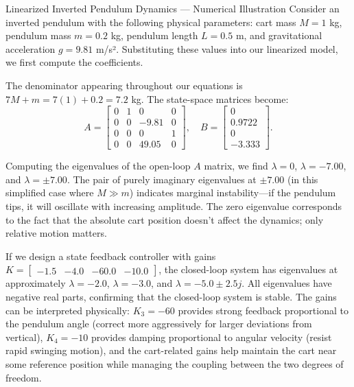 \begin{example}{Linearized Inverted Pendulum Dynamics — Numerical Illustration}
Consider an inverted pendulum with the following physical parameters: cart mass $M = 1$ kg, pendulum mass $m = 0.2$ kg, pendulum length $L = 0.5$ m, and gravitational acceleration $g = 9.81$ m/s². Substituting these values into our linearized model, we first compute the coefficients.

The denominator appearing throughout our equations is $7M + m = 7(1) + 0.2 = 7.2$ kg. The state-space matrices become:
\begin{equation}
A = \begin{bmatrix}
0 & 1 & 0 & 0 \\
0 & 0 & -9.81 & 0 \\
0 & 0 & 0 & 1 \\
0 & 0 & 49.05 & 0
\end{bmatrix}, \quad
B = \begin{bmatrix} 0 \\ 0.9722 \\ 0 \\ -3.333 \end{bmatrix}.
\end{equation}

Computing the eigenvalues of the open-loop $A$ matrix, we find $\lambda = 0$, $\lambda = -7.00$, and $\lambda = \pm 7.00$. The pair of purely imaginary eigenvalues at $\pm 7.00$ (in this simplified case where $M \gg m$) indicates marginal instability—if the pendulum tips, it will oscillate with increasing amplitude. The zero eigenvalue corresponds to the fact that the absolute cart position doesn't affect the dynamics; only relative motion matters.

If we design a state feedback controller with gains $K = \begin{bmatrix} -1.5 & -4.0 & -60.0 & -10.0 \end{bmatrix}$, the closed-loop system has eigenvalues at approximately $\lambda = -2.0$, $\lambda = -3.0$, and $\lambda = -5.0 \pm 2.5j$. All eigenvalues have negative real parts, confirming that the closed-loop system is stable. The gains can be interpreted physically: $K_3 = -60$ provides strong feedback proportional to the pendulum angle (correct more aggressively for larger deviations from vertical), $K_4 = -10$ provides damping proportional to angular velocity (resist rapid swinging motion), and the cart-related gains help maintain the cart near some reference position while managing the coupling between the two degrees of freedom.
\end{example}

